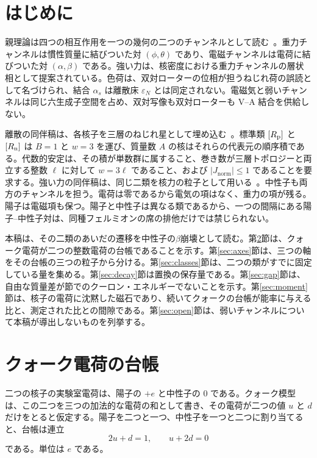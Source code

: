 \documentclass[a4paper]{article}
\newcommand{\Jnorm}{J_{\mathrm{norm}}}
\begin{document}
\section{はじめに}
\label{sec:intro}

親理論は四つの相互作用を一つの幾何の二つのチャンネルとして読む~\cite{dst-main}。重力チャンネルは慣性質量に結びついた対 \((\phi,\theta)\) であり、電磁チャンネルは電荷に結びついた対 \((\alpha,\beta)\) である。強い力は、核密度における重力チャンネルの層状相として提案されている。色荷は、双対ローターの位相が担うねじれ荷の誤読として名づけられ、結合 \(\alpha_s\) は離散床 \(\varepsilon_N\) とは同定されない。電磁気と弱いチャンネルは同じ六生成子空間を占め、双対写像も双対ローターも V--A 結合を供給しない。

離散の同伴稿は、各核子を三層のねじれ星として埋め込む~\cite{dst-dio}。標準類 \([R_{\rm p}]\) と \([R_{\rm n}]\) は \(B=1\) と \(w=3\) を運び、質量数 \(A\) の核はそれらの代表元の順序積である。代数的安定は、その積が単数群に属すること、巻き数が三層トポロジーと両立する整数 \(\ell\) に対して \(w=3\ell\) であること、および \(|\Jnorm|\le 1\) であることを要求する。強い力の同伴稿は、同じ二類を核力の粒子として用いる~\cite{dst-strong}。中性子も両方のチャンネルを担う。電荷は零であるから電気の項はなく、重力の項が残る。陽子は電磁項も保つ。陽子と中性子は異なる類であるから、一つの間隔にある陽子--中性子対は、同種フェルミオンの席の排他だけでは禁じられない。

本稿は、その二類のあいだの遷移を中性子の\(\beta\)崩壊として読む。第\ref{sec:chart}節は、クォーク電荷が二つの整数電荷の台帳であることを示す。第\ref{sec:axes}節は、三つの軸をその台帳の三つの粒子から分ける。第\ref{sec:classes}節は、二つの類がすでに固定している量を集める。第\ref{sec:decay}節は置換の保存量である。第\ref{sec:gap}節は、自由な質量差が節でのクーロン・エネルギーでないことを示す。第\ref{sec:moment}節は、核子の電荷に沈黙した磁石であり、続いてクォークの台帳が能率に与える比と、測定された比との間隙である。第\ref{sec:open}節は、弱いチャンネルについて本稿が導出しないものを列挙する。

\section{クォーク電荷の台帳}
\label{sec:chart}

二つの核子の実験室電荷は、陽子の \(+e\) と中性子の \(0\) である。クォーク模型は、この二つを三つの加法的な電荷の和として書き、その電荷が二つの値 \(u\) と \(d\) だけをとると仮定する。陽子を二つと一つ、中性子を一つと二つに割り当てると、台帳は連立
\begin{equation}
\label{eq:chart}
2u+d=1,
\qquad
u+2d=0
\end{equation}
である。単位は \(e\) である。
\end{document}
